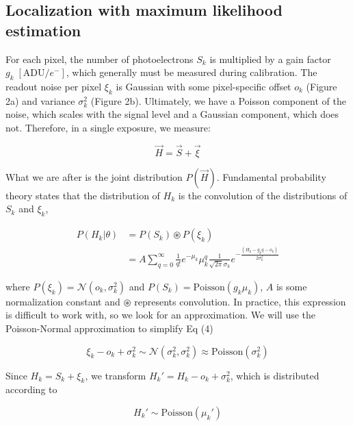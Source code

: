 \documentclass{ucetd}
\begin{document}
\subsection{Localization with maximum likelihood estimation}

For each pixel, the number of photoelectrons $S_{k}$ is  multiplied by a gain factor $g_{k} \;[\mathrm{ADU}/e^{-}]$, which generally must be measured during calibration. The readout noise per pixel $\xi_{k}$ is Gaussian with some pixel-specific offset $o_{k}$ (Figure 2a) and variance $\sigma_{k}^{2}$ (Figure 2b). Ultimately, we have a Poisson component of the noise, which scales with the signal level and a Gaussian component, which does not. Therefore, in a single exposure, we measure: 

\begin{equation}
\vec{H} = \vec{S} + \vec{\xi}
\end{equation}

What we are after is the joint distribution $P(\vec{H})$. Fundamental probability theory states that the distribution of $H_{k}$ is the convolution of the distributions of $S_{k}$ and $\xi_{k}$,

\begin{align}
P(H_{k}|\theta) &= P(S_{k})\circledast P(\xi_{k})\\
&= A\sum_{q=0}^{\infty} \frac{1}{q!}e^{-\mu_{k}}\mu_{k}^{q}\frac{1}{\sqrt{2\pi}\sigma_{k}}e^{-\frac{(H_{k}-g_{k}q-o_{k})}{2\sigma_{k}^{2}}}
\end{align}

where $P(\xi_{k}) = \mathcal{N}(o_{k},\sigma_{k}^{2})$ and $P(S_{k}) = \mathrm{Poisson}(g_{k}\mu_{k})$,  $A$ is some normalization constant and $\circledast$ represents convolution. In practice, this expression is difficult to work with, so we look for an approximation. We will use the Poisson-Normal approximation to simplify Eq (4)

\begin{equation*}
\xi_{k} - o_{k} + \sigma_{k}^{2} \sim \mathcal{N}(\sigma_{k}^{2},\sigma_{k}^{2}) \approx \mathrm{Poisson}(\sigma_{k}^{2})
\end{equation*}

Since $H_{k} = S_{k} + \xi_{k}$, we transform $H_{k}' = H_{k} - o_{k} + \sigma_{k}^{2}$, which is distributed according to 

\begin{equation*}
H_{k}' \sim \mathrm{Poisson}(\mu_{k}')
\end{equation*}
\end{document}
